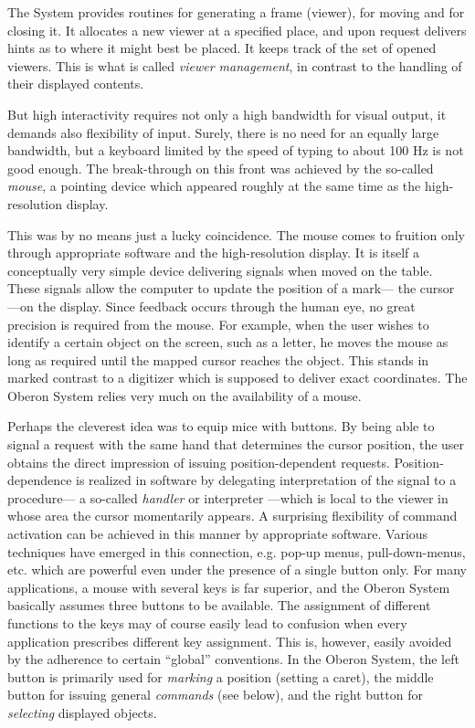 The System provides routines for generating a frame (viewer), for
moving and for closing it. It allocates a new viewer at a specified
place, and upon request delivers hints as to where it might best be
placed. It keeps track of the set of opened viewers. This is what is
called {\it viewer management\/}, in contrast to the handling of their
displayed contents.

But high interactivity requires not only a high bandwidth for visual
output, it demands also flexibility of input. Surely, there is no need
for an equally large bandwidth, but a keyboard limited by the speed of
typing to about 100 Hz is not good enough. The break-through on this
front was achieved by the so-called {\it mouse\/}, a pointing device which
appeared roughly at the same time as the high-resolution display.

This was by no means just a lucky coincidence. The mouse comes to
fruition only through appropriate software and the high-resolution
display. It is itself a conceptually very simple device delivering
signals when moved on the table. These signals allow the computer to
update the position of a mark--- the cursor ---on the display. Since
feedback occurs through the human eye, no great precision is required
from the mouse. For example, when the user wishes to identify a
certain object on the screen, such as a letter, he moves the mouse as
long as required until the mapped cursor reaches the object. This
stands in marked contrast to a digitizer which is supposed to deliver
exact coordinates. The Oberon System relies very much on the
availability of a mouse.

Perhaps the cleverest idea was to equip mice with buttons. By being
able to signal a request with the same hand that determines the cursor
position, the user obtains the direct impression of issuing
position-dependent requests. Position-dependence is realized in
software by delegating interpretation of the signal to a procedure---
a so-called {\it handler\/} or interpreter ---which is local to the viewer in
whose area the cursor momentarily appears. A surprising flexibility of
command activation can be achieved in this manner by appropriate
software. Various techniques have emerged in this connection,
e.g. pop-up menus, pull-down-menus, etc. which are powerful even under
the presence of a single button only. For many applications, a mouse
with several keys is far superior, and the Oberon System basically
assumes three buttons to be available. The assignment of different
functions to the keys may of course easily lead to confusion when
every application prescribes different key assignment. This is,
however, easily avoided by the adherence to certain ``global''
conventions. In the Oberon System, the left button is primarily used
for {\it marking\/} a position (setting a caret), the middle button for
issuing general {\it commands\/} (see below), and the right button for
{\it selecting\/} displayed objects.

